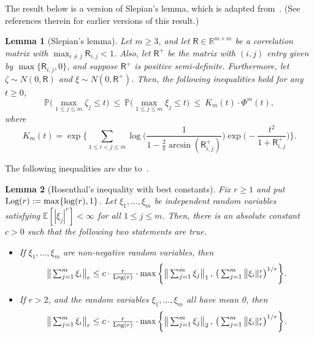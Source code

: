 \documentclass[aos,preprint]{imsart}
\numberwithin{equation}{section}
\theoremstyle{plain}
\newtheorem{lemma}{Lemma}[section]
\newcommand{\R}{\mathbb{R}}
\renewcommand{\P}{\mathbb{P}}
\newcommand{\E}{\mathbb{E}}
\newcommand{\tsum}{\textstyle\sum}
\newcommand{\ts}{\textstyle}
\newcommand{\1}{{\bf{1}}}
\newcommand{\0}{\mathbf{0}}
\begin{document}
\noindent The result below is a version of Slepian's lemma, which is adapted from~\cite[Theorem 2.2]{Li:Shao:2002}. (See references therein for earlier versions of this result.)
\begin{lemma}[Slepian's lemma]\label{lem:slepian} 
Let $m\geq 3$, and let $\mathsf{R}\in\R^{m\times m}$ be a correlation matrix with $\max_{i\neq j}\mathsf{R}_{i,j}<1$. Also, let $\mathsf{R}^+$ be the matrix with $(i,j)$ entry given by $\max\{\mathsf{R}_{i,j},0\}$, and suppose $\mathsf{R}^+$ is positive semi-definite. Furthermore, let $\zeta\sim N(0,\mathsf{R})$ and $\xi\sim N(0,\mathsf{R}^+)$. Then, the following inequalities hold for any $t\geq 0$,
\begin{equation}
 \P\Big(\max_{1\leq j\leq m} \zeta_j  \leq t\Big) \ \leq \ \P\Big(\max_{1\leq j\leq m} \xi_j\leq t\Big) \ \leq \  K_m(t) \cdot \Phi^m(t),
\end{equation}
where
\begin{equation}
K_m(t)=\exp\Bigg\{\sum_{1\leq i<j\leq m} \log\Big(\ts\frac{1}{1-\ts\frac{2}{\pi}\arcsin(\mathsf{R}_{i,j}^+)}\Big)\exp\Big(-\ts\frac{t^2}{1+\mathsf{R}_{i,j}^+}\Big)\Bigg\}.
\end{equation}

\end{lemma}

%
%
%
%
\noindent The following inequalities are due to~\cite{Zinn:1985}. 
%
%
\begin{lemma}[Rosenthal's inequality with best constants]\label{lem:rosenthal}
Fix $r\geq 1$ and put $\textup{Log}(r):=\max\{\log(r),1\}$. Let $\xi_1,\dots,\xi_m$ be independent random variables satisfying $\E[|\xi_j|^r]<\infty$ for all $1\leq j\leq m$. Then, there is an absolute constant $c>0$ such that the following two statements are true.
\begin{itemize}
\item[(i).] If $\xi_1,\dots,\xi_m$ are non-negative random variables, then 
	\begin{equation}
	\big\|\tsum_{j=1}^m \xi_i\big\|_r\leq c\cdot \ts\frac{r}{\textup{Log}(r)} \cdot \max\bigg\{ \big\|\tsum_{j=1}^m \xi_j\big\|_1 \, , \, \big(\tsum_{j=1}^m \big\|\xi_i\|_r^r\big)^{1/r}\bigg\}.
	\end{equation}
%
%
\item[(ii).] If $r>2$, and the random variables $\xi_1,\dots,\xi_m$ all have mean 0, then
	\begin{equation}
	\big\|\tsum_{j=1}^m \xi_i\big\|_r\leq c\cdot \ts\frac{r}{\textup{Log}(r)} \cdot \max\bigg\{ \big\|\tsum_{j=1}^m \xi_j\big\|_2 \, , \, \big(\tsum_{j=1}^m \big\|\xi_i\|_r^r\big)^{1/r}\bigg\}.
	\end{equation}
	\end{itemize}
\end{lemma}
\end{document}
